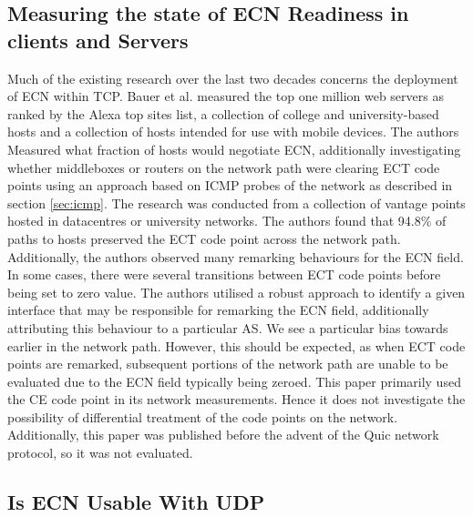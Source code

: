 \documentclass{l4proj}
\begin{document}
\subsection{Measuring the state of ECN Readiness in clients and Servers}


Much of the existing research over the last two decades concerns the deployment of ECN within TCP. Bauer et al.\cite{bauer_measuring_2011} measured the top one million web servers as ranked by the Alexa top sites list, a collection of college and university-based hosts and a collection of hosts intended for use with mobile devices. The authors Measured what fraction of hosts would negotiate ECN, additionally investigating whether middleboxes or routers on the network path were clearing ECT code points using an approach based on ICMP probes of the network as described in section \ref{sec:icmp}. The research was conducted from a collection of vantage points hosted in datacentres or university networks. The authors found that 94.8\% of paths to hosts preserved the ECT code point across the network path. Additionally, the authors observed many remarking behaviours for the ECN field.
In some cases, there were several transitions between ECT code points before being set to zero value. The authors utilised a robust approach to identify a given interface that may be responsible for remarking the ECN field, additionally attributing this behaviour to a particular AS. We see a particular bias towards earlier in the network path. However, this should be expected, as when ECT code points are remarked, subsequent portions of the network path are unable to be evaluated due to the ECN field typically being zeroed. This paper primarily used the CE code point in its network measurements. Hence it does not investigate the possibility of differential treatment of the code points on the network. Additionally, this paper was published before the advent of the Quic network protocol, so it was not evaluated.


\subsection{Is ECN Usable With UDP}
\end{document}
